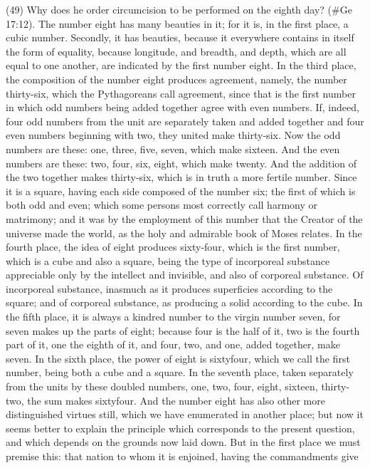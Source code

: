 (49) Why does he order circumcision to be performed on the eighth day? (\#Ge 17:12). The
number eight has many beauties in it; for it is, in the first place, a cubic number. Secondly, it has
beauties, because it everywhere contains in itself the form of equality, because longitude, and
breadth, and depth, which are all equal to one another, are indicated by the first number eight. In
the third place, the composition of the number eight produces agreement, namely, the number
thirty-six, which the Pythagoreans call agreement, since that is the first number in which odd
numbers being added together agree with even numbers. If, indeed, four odd numbers from the unit
are separately taken and added together and four even numbers beginning with two, they united
make thirty-six. Now the odd numbers are these: one, three, five, seven, which make sixteen. And
the even numbers are these: two, four, six, eight, which make twenty. And the addition of the two
together makes thirty-six, which is in truth a more fertile number. Since it is a square, having each
side composed of the number six; the first of which is both odd and even; which some persons
most correctly call harmony or matrimony; and it was by the employment of this number that the
Creator of the universe made the world, as the holy and admirable book of Moses relates. In the
fourth place, the idea of eight produces sixty-four, which is the first number, which is a cube and
also a square, being the type of incorporeal substance appreciable only by the intellect and
invisible, and also of corporeal substance. Of incorporeal substance, inasmuch as it produces
superficies according to the square; and of corporeal substance, as producing a solid according to
the cube. In the fifth place, it is always a kindred number to the virgin number seven, for seven
makes up the parts of eight; because four is the half of it, two is the fourth part of it, one the eighth
of it, and four, two, and one, added together, make seven. In the sixth place, the power of eight is
sixtyfour, which we call the first number, being both a cube and a square. In the seventh place,
taken separately from the units by these doubled numbers, one, two, four, eight, sixteen, thirty-two,
the sum makes sixtyfour. And the number eight has also other more distinguished virtues still,
which we have enumerated in another place; but now it seems better to explain the principle which
corresponds to the present question, and which depends on the grounds now laid down. But in the
first place we must premise this: that nation to whom it is enjoined, having the commandments give
